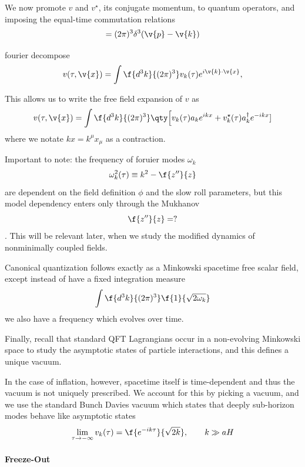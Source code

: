 We now promote $v$ and $v^\star$, its conjugate momentum, to quantum operators, and imposing the equal-time commutation relations
\begin{equation}
    [a_k,a_p^\dagger]=(2\pi)^3\delta^3(\v{p}-\v{k})
\end{equation}


fourier decompose
\begin{equation}
v(\tau,\v{x}) = \int \f{d^3k}{(2\pi)^3} v_k(\tau) e^{i\v{k}\cdot\v{x}},
\end{equation}

This allows us to write the free field expansion of $v$ as
\begin{equation}
    v(\tau,\v{x})=\int \f{d^3k}{(2\pi)^3}\qty\Big[v_k(\tau)a_ke^{ikx}+v^\star_k(\tau)a^\dagger_ke^{-ikx}]
\end{equation}
where we notate $kx=k^\mu x_\mu$ as a contraction.



Important to note: the frequency of foruier modes $\omega_k$ 
\begin{equation}
    \omega^2_k(\tau)\equiv k^2-\f{z''}{z}
\end{equation}
are dependent on the field definition $\phi$ and the slow roll parameters, but this model dependency enters only through the Mukhanov
\[
\f{z''}{z}=?
\]
. This will be relevant later, when we study the modified dynamics of nonminimally coupled fields.

Canonical quantization follows exactly as a Minkowski spacetime free scalar field, except instead of have a fixed integration measure
\[
\int \f{d^3k}{(2\pi)^3}\f{1}{\sqrt{2\omega_k}}
\]
we also have a frequency which evolves over time. 



Finally, recall that standard QFT Lagrangians occur in a non-evolving Minkowski space to study the asymptotic states of particle interactions, and this defines a unique vacuum.

In the case of inflation, however, spacetime itself is time-dependent and thus the vacuum is not uniquely prescribed. We account for this by picking a vacuum, and we use the standard Bunch Davies vacuum which states that deeply sub-horizon modes behave like asymptotic states
\begin{equation}
    \lim_{\tau\to -\infty} v_k(\tau) = \f{e^{-ik\tau}}{\sqrt{2k}}, \qquad k\gg aH
\end{equation}

\paragraph{Freeze-Out}

